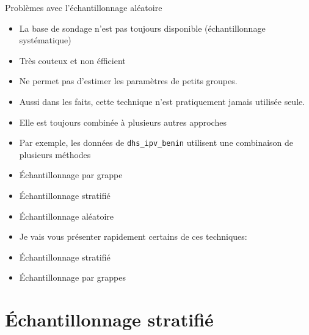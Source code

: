 \documentclass[ignorenonframetext,]{beamer}
\providecommand{\tightlist}{%
  \setlength{\itemsep}{0pt}\setlength{\parskip}{0pt}}
\begin{document}
\begin{frame}[fragile]{Problèmes avec l'échantillonnage aléatoire}

\begin{itemize}
\tightlist
\item
  La base de sondage n'est pas toujours disponible (échantillonnage
  systématique)
\item
  Très couteux et non éfficient
\item
  Ne permet pas d'estimer les paramètres de petits groupes.
\item
  Aussi dans les faits, cette technique n'est pratiquement jamais
  utilisée seule.
\item
  Elle est toujours combinée à plusieurs autres approches
\item
  Par exemple, les données de \texttt{dhs\_ipv\_benin} utilisent une
  combinaison de plusieurs méthodes
\item
  Échantillonnage par grappe
\item
  Échantillonnage stratifié
\item
  Échantillonnage aléatoire
\item
  Je vais vous présenter rapidement certains de ces techniques:
\item
  Échantillonnage stratifié
\item
  Échantillonnage par grappes
\end{itemize}

\end{frame}

\section{Échantillonnage
stratifié}\label{uxe9chantillonnage-stratifiuxe9}
\end{document}
